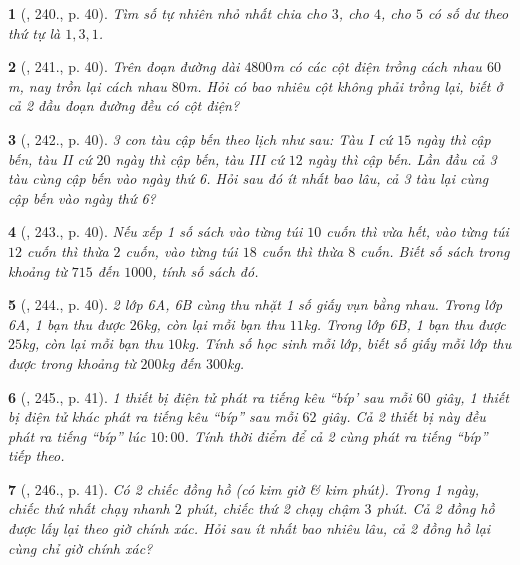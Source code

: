 \documentclass{article}
\newtheorem{baitoan}{}
\begin{document}
\begin{baitoan}[\cite{Binh_Toan_6_tap_1}, 240., p. 40]
	Tìm số tự nhiên nhỏ nhất chia cho $3$, cho $4$, cho $5$ có số dư theo thứ tự là $1,3,1$.
\end{baitoan}

\begin{baitoan}[\cite{Binh_Toan_6_tap_1}, 241., p. 40]
	Trên đoạn đường dài $4800$\emph{m} có các cột điện trồng cách nhau $60$\emph{m}, nay trồn lại cách nhau $80$\emph{m}. Hỏi có bao nhiêu cột không phải trồng lại, biết ở cả 2 đầu đoạn đường đều có cột điện?
\end{baitoan}

\begin{baitoan}[\cite{Binh_Toan_6_tap_1}, 242., p. 40]
	3 con tàu cập bến theo lịch như sau: Tàu I cứ $15$ ngày thì cập bến, tàu II cứ $20$ ngày thì cập bến, tàu III cứ $12$ ngày thì cập bến. Lần đầu cả 3 tàu cùng cập bến vào ngày thứ 6. Hỏi sau đó ít nhất bao lâu, cả 3 tàu lại cùng cập bến vào ngày thứ 6?
\end{baitoan}

\begin{baitoan}[\cite{Binh_Toan_6_tap_1}, 243., p. 40]
	Nếu xếp 1 số sách vào từng túi $10$ cuốn thì vừa hết, vào từng túi $12$ cuốn thì thừa $2$ cuốn, vào từng túi $18$ cuốn thì thừa $8$ cuốn. Biết số sách trong khoảng từ $715$ đến $1000$, tính số sách đó.
\end{baitoan}

\begin{baitoan}[\cite{Binh_Toan_6_tap_1}, 244., p. 40]
	2 lớp 6A, 6B cùng thu nhặt 1 số giấy vụn bằng nhau. Trong lớp 6A, 1 bạn thu được $26$\emph{kg}, còn lại mỗi bạn thu $11$\emph{kg}. Trong lớp 6B, 1 bạn thu được $25$\emph{kg}, còn lại mỗi bạn thu $10$\emph{kg}. Tính số học sinh mỗi lớp, biết số giấy mỗi lớp thu được trong khoảng từ $200$\emph{kg} đến $300$\emph{kg}.
\end{baitoan}

\begin{baitoan}[\cite{Binh_Toan_6_tap_1}, 245., p. 41]
	1 thiết bị điện tử phát ra tiếng kêu ``bíp' sau mỗi $60$ giây, 1 thiết bị điện tử khác phát ra tiếng kêu ``bíp'' sau mỗi $62$ giây. Cả 2 thiết bị này đều phát ra tiếng ``bíp'' lúc $10:00$. Tính thời điểm để cả 2 cùng phát ra tiếng ``bíp'' tiếp theo.
\end{baitoan}

\begin{baitoan}[\cite{Binh_Toan_6_tap_1}, 246., p. 41]
	Có 2 chiếc đồng hồ (có kim giờ \& kim phút). Trong 1 ngày, chiếc thứ nhất chạy nhanh $2$ phút, chiếc thứ 2 chạy chậm $3$ phút. Cả 2 đồng hồ được lấy lại theo giờ chính xác. Hỏi sau ít nhất bao nhiêu lâu, cả 2 đồng hồ lại cùng chỉ giờ chính xác?
\end{baitoan}
\end{document}
